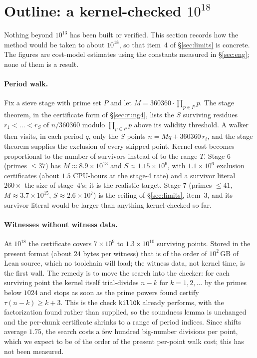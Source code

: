 \documentclass[11pt]{article}
\begin{document}
\section{Outline: a kernel-checked $10^{18}$}\label{sec:outline}

Nothing beyond $10^{13}$ has been built or verified. This section records how the method would be taken to about $10^{18}$, so that item~4 of \S\ref{sec:limits} is concrete. The figures are cost-model estimates using the constants measured in \S\ref{sec:eng}; none of them is a result.

\paragraph{Period walk.} Fix a sieve stage with prime set $P$ and let $M=360360\cdot\prod_{p\in P}p$. The stage theorem, in the certificate form of \S\ref{sec:rung4}, lists the $S$ surviving residues $r_1<\dots<r_S$ of $n/360360$ modulo $\prod_{p\in P}p$ above its validity threshold. A walker then visits, in each period $q$, only the $S$ points $n=Mq+360360\,r_i$, and the stage theorem supplies the exclusion of every skipped point. Kernel cost becomes proportional to the number of survivors instead of to the range $T$. Stage 6 (primes $\le37$) has $M\approx8.9\times10^{13}$ and $S\approx1.15\times10^{6}$, with $1.1\times10^{6}$ exclusion certificates (about $1.5$ CPU-hours at the stage-4 rate) and a survivor literal $260\times$ the size of stage~4's; it is the realistic target. Stage 7 (primes $\le41$, $M\approx3.7\times10^{15}$, $S\approx2.6\times10^{7}$) is the ceiling of \S\ref{sec:limits}, item~3, and its survivor literal would be larger than anything kernel-checked so far.

\paragraph{Witnesses without witness data.} At $10^{18}$ the certificate covers $7\times10^{9}$ to $1.3\times10^{10}$ surviving points. Stored in the present format (about $24$ bytes per witness) that is of the order of $10^{2}$\,GB of Lean source, which no toolchain will load; the witness data, not kernel time, is the first wall. The remedy is to move the search into the checker: for each surviving point the kernel itself trial-divides $n-k$ for $k=1,2,\dots$ by the primes below $1024$ and stops as soon as the prime powers found certify $\tau(n-k)\ge k+3$. This is the check \texttt{killOk} already performs, with the factorization found rather than supplied, so the soundness lemma is unchanged and the per-chunk certificate shrinks to a range of period indices. Since shifts average $1.75$, the search costs a few hundred big-number divisions per point, which we expect to be of the order of the present per-point walk cost; this has not been measured.
\end{document}
